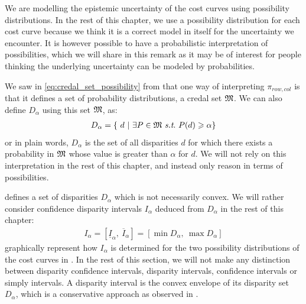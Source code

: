 \begin{remark}
    We are modelling the epistemic uncertainty of the cost curves using possibility distributions. In the rest of this chapter, we use a possibility distribution for each cost curve because we think it is a correct model in itself for the uncertainty we encounter. It is however possible to have a probabilistic interpretation of possibilities, which we will share in this remark as it may be of interest for people thinking the underlying uncertainty can be modeled by probabilities.
    
    We saw in \cref{eq:credal_set_possibility} from  that one way of interpreting $\pi_{row,col}$ is that it defines a set of probability distributions, \ie a credal set $\mathfrak{M}$. We can also define $D_\alpha$ using this set $\mathfrak{M}$, as:
    \begin{align}
        D_\alpha=\{~ d ~|~ \exists P\in\M ~\st~ P(d)\geqslant \alpha\}
    \end{align}
    or in plain words, $D_\alpha$ is the set of all disparities $d$ for which there exists a probability in $\mathfrak{M}$ whose value is greater than $\alpha$ for $d$. We will not rely on this interpretation in the rest of this chapter, and instead only reason in terms of possibilities.
\end{remark}


 defines a set of disparities $D_\alpha$ which is not necessarily convex. We will rather consider confidence disparity intervals $I_\alpha$ deduced from $D_\alpha$ in the rest of this chapter:
\begin{align}
    I_\alpha = [\underline{I}_\alpha,~\overline{I}_\alpha]=[\min D_\alpha, ~\max D_\alpha]\label{eq:confidence_disparity_intervals}
\end{align}
 graphically represent how $I_\alpha$ is determined for the two possibility distributions of the cost curves in . In the rest of this section, we will not make any distinction between disparity confidence intervals, disparity intervals, confidence intervals or simply intervals. A disparity interval is the convex envelope of its disparity set $D_\alpha$, which is a conservative approach as observed in .

